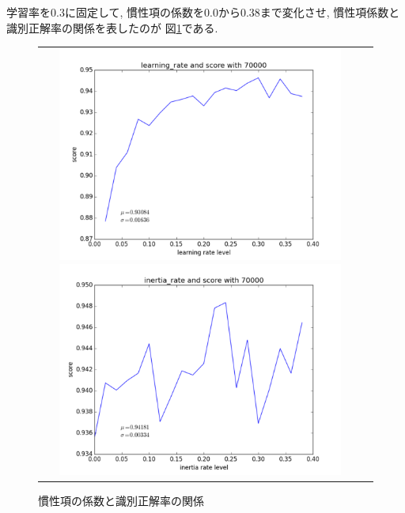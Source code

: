\documentclass[10pt]{jarticle}
\begin{document}
学習率を0.3に固定して, 慣性項の係数を0.0から0.38まで変化させ,
慣性項係数と識別正解率の関係を表したのが
図\ref{fig:inertia-rate-score-var}である. 
\begin{figure}[htbp]
  \begin{tabular}{cc}
    \begin{minipage}{0.5\hsize}
      \begin{center}
        \includegraphics[width=0.9\textwidth]{assets/img/learning_rate_test_mnist_70000.pdf}
        \caption{学習率と識別正解率の関係}
        \label{fig:learning-rate-score-var}
      \end{center}
    \end{minipage}
    \begin{minipage}{0.5\hsize}
      \begin{center}
        \includegraphics[width=0.9\textwidth]{assets/img/inertia_rate_test_mnist_70000.pdf}
        \caption{慣性項の係数と識別正解率の関係}
        \label{fig:inertia-rate-score-var}
      \end{center}
    \end{minipage}
  \end{tabular}
\end{figure}
\end{document}
